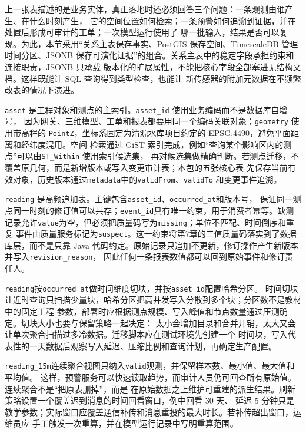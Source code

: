上一张表描述的是业务实体，真正落地时还必须回答三个问题：一条观测由谁产生、在什么时刻产生，
它的空间位置如何检索；一条预警如何追溯到证据，并在处置后形成可审计的工单；一次模型运行使用了
哪一批输入，结果是否可以复现。为此，本节采用“关系主表保存事实、PostGIS 保存空间、TimescaleDB
管理时间分区、JSONB 保存可演化证据”的组合。关系主表中的稳定字段承担约束和连接职责，JSONB 只承载
版本化的扩展属性，不能把核心字段全部塞进无结构文档。这样既能让 SQL 查询得到类型检查，也能让
新传感器的附加元数据在不频繁改表的情况下演进。

\texttt{asset} 是工程对象和测点的主索引。\texttt{asset\_id} 使用业务编码而不是数据库自增号，
因为网关、三维模型、工单和报表都要用同一个编码关联对象；\texttt{geometry} 使用带高程的
\texttt{PointZ}，坐标系固定为清源水库项目约定的 EPSG:4490，避免平面距离和经纬度混用。空间
检索通过 GiST 索引完成，例如“查询某个影响区内的测点”可以由\texttt{ST\_Within} 使用索引候选集，
再对候选集做精确判断。若测点迁移，不覆盖原几何，而是新增版本或写入变更审计表；本包的五张核心表
先保存当前有效对象，历史版本通过\texttt{metadata}中的\texttt{validFrom}、\texttt{validTo}
和变更事件追溯。

\texttt{reading} 是高频追加表。主键包含\texttt{asset\_id}、\texttt{occurred\_at}和版本号，
保证同一测点同一时刻的修订值可以共存；\texttt{event\_id}具有唯一约束，用于消费者幂等。缺测
记录允许\texttt{value}为空，但必须把质量码写为\texttt{missing}；单位不匹配、时间倒序和重复
事件由质量服务标记为\texttt{suspect}。这一约束将第7章的三值质量码落实到了数据库层，而不是只靠
Java 代码约定。原始记录只追加不更新，修订操作产生新版本并写入\texttt{revision\_reason}，
因此任何一条报表数值都可以回到原始事件和修订责任人。

\texttt{reading}按\texttt{occurred\_at}做时间维度切块，并按\texttt{asset\_id}配置哈希分区。
时间切块让近时查询只扫描少量块，哈希分区把高并发写入分散到多个块；分区数不是教材中的固定工程
参数，部署时应根据测点规模、写入峰值和节点数量通过压测确定。切块大小也要与保留策略一起决定：
太小会增加目录和合并开销，太大又会让单次聚合扫描过多冷数据。迁移脚本应在测试环境先创建一个
时间块，写入代表性的一天数据后观察写入延迟、压缩比例和查询计划，再确定生产配置。

\texttt{reading\_15m}连续聚合视图只纳入\texttt{valid}观测，并保留样本数、最小值、最大值和平均值。
这样，预警服务可以快速读取趋势，而审计人员仍可回查所有原始值。连续聚合不是“把原表删掉”，而是
在原始数据之上维护可重建的派生结果。刷新策略设置一个覆盖迟到消息的时间回看窗口，例中回看 30 天、
延迟 5 分钟只是教学参数；实际窗口应覆盖通信补传和消息重投的最大时长。若补传超出窗口，运维员应
手工触发一次重算，并在模型运行记录中写明重算范围。

